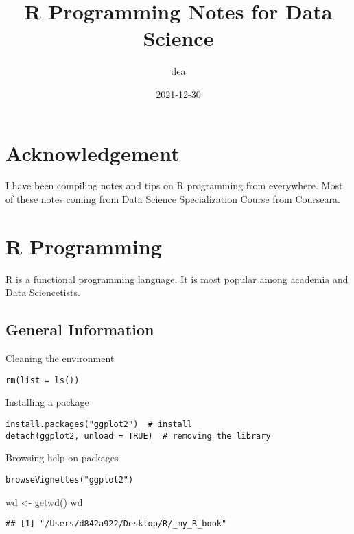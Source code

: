 \documentclass[
]{book}
\title{R Programming Notes for Data Science}
\author{dea}
\date{2021-12-30}
\newenvironment{Shaded}{\begin{snugshade}}{\end{snugshade}}
\newcommand{\FunctionTok}[1]{\textcolor[rgb]{0.00,0.00,0.00}{#1}}
\newcommand{\NormalTok}[1]{#1}
\newcommand{\OtherTok}[1]{\textcolor[rgb]{0.56,0.35,0.01}{#1}}
\begin{document}
\maketitle

{
\setcounter{tocdepth}{1}
\tableofcontents
}
\hypertarget{acknowledgement}{%
\chapter{Acknowledgement}\label{acknowledgement}}

I have been compiling notes and tips on R programming from everywhere. Most of these notes coming from Data Science Specialization Course from Courseara.

\hypertarget{r-programming}{%
\chapter{R Programming}\label{r-programming}}

R is a functional programming language. It is most popular among academia and Data Sciencetists.

\hypertarget{general-information}{%
\section{General Information}\label{general-information}}

Cleaning the environment

\begin{verbatim}
rm(list = ls())
\end{verbatim}

Installing a package

\begin{verbatim}
install.packages("ggplot2")  # install
detach(ggplot2, unload = TRUE)  # removing the library 
\end{verbatim}

Browsing help on packages

\begin{verbatim}
browseVignettes("ggplot2")
\end{verbatim}

\begin{Shaded}
\begin{Highlighting}[]
\NormalTok{wd }\OtherTok{\textless{}{-}} \FunctionTok{getwd}\NormalTok{()}
\NormalTok{wd}
\end{Highlighting}
\end{Shaded}

\begin{verbatim}
## [1] "/Users/d842a922/Desktop/R/_my_R_book"
\end{verbatim}
\end{document}
